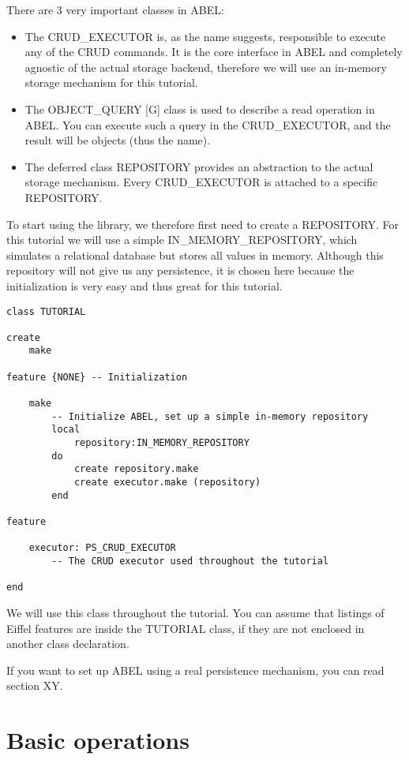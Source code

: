 There are 3 very important classes in ABEL:
\begin{itemize}
 \item The CRUD\_EXECUTOR is, as the name suggests, responsible to execute any of the CRUD commands.
	It is the core interface in ABEL and completely agnostic of the actual storage backend, therefore we will use an in-memory storage mechanism for this tutorial.

 \item The OBJECT\_QUERY [G] class is used to describe a read operation in ABEL. You can execute such a query in the CRUD\_EXECUTOR, and the result will be objects (thus the name).

 \item The deferred class REPOSITORY provides an abstraction to the actual storage mechanism.
	Every CRUD\_EXECUTOR is attached to a specific REPOSITORY.
\end{itemize}


To start using the library, we therefore first need to create a REPOSITORY.
For this tutorial we will use a simple IN\_MEMORY\_REPOSITORY, which simulates a relational database but stores all values in memory.
Although this repository will not give us any persistence, it is chosen here because the initialization is very easy and thus great for this tutorial.


\begin{lstlisting}[language=OOSC2Eiffel, captionpos=b, caption={The TUTORIAL class}, label={lst:tutorial_class}]
class TUTORIAL

create
	make

feature {NONE} -- Initialization

	make
		-- Initialize ABEL, set up a simple in-memory repository
		local
			repository:IN_MEMORY_REPOSITORY
		do
			create repository.make
			create executor.make (repository)
		end

feature
	
	executor: PS_CRUD_EXECUTOR
		-- The CRUD executor used throughout the tutorial

end
\end{lstlisting}

We will use this class throughout the tutorial. You can assume that listings of Eiffel features are inside the TUTORIAL class, if they are not enclosed in another class declaration.

If you want to set up ABEL using a real persistence mechanism, you can read section XY.

\section{Basic operations}

